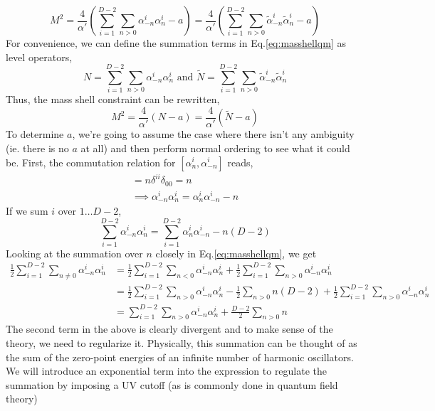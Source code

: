 \documentclass{article}
\providecommand{\brak}[1]{\ensuremath{\left(#1\right)}} %
\begin{document}
\begin{equation}
    M^2 = \frac{4}{\alpha'}\brak{\sum_{i=1}^{D-2}\sum_{n>0}\alpha_{-n}^i\alpha_n^i-a}=\frac{4}{\alpha'}\brak{\sum_{i=1}^{D-2}\sum_{n>0}\tilde{\alpha}_{-n}^i\tilde{\alpha}_n^i-a}\label{eq:masshellqm}
\end{equation}
For convenience, we can define the summation terms in Eq.\eqref{eq:masshellqm} as level operators,
\begin{equation}
    N=\sum_{i=1}^{D-2}\sum_{n>0}\alpha_{-n}^i\alpha_n^i \text{  and  } \tilde{N}=\sum_{i=1}^{D-2}\sum_{n>0}\tilde{\alpha}_{-n}^i\tilde{\alpha}_n^i
\end{equation}
Thus, the mass shell constraint can be rewritten,
\begin{equation}
    M^2=\frac{4}{\alpha'}(N-a) =\frac{4}{\alpha'}(\tilde{N}-a)
\end{equation}
To determine $a$, we're going to assume the case where there isn't any ambiguity (ie. there is no $a$ at all) and then perform normal ordering to see what it could be. First, the commutation relation for $[\alpha_n^i,\alpha_{-n}^i]$ reads,
\begin{align}
    [\alpha_n^i,\alpha_{-n}^i] = n\delta^{ii}\delta_{00}=n\\
    \implies \alpha_{-n}^i\alpha_n^i = \alpha_n^i\alpha_{-n}^i-n
\end{align}
If we sum $i$ over $1\dots D-2$,
\begin{equation}
    \sum_{i=1}^{D-2}\alpha_{-n}^i\alpha_n^i=\sum_{i=1}^{D-2}\alpha_n^i\alpha_{-n}^i-n(D-2)
\end{equation}
Looking at the summation over $n$ closely in Eq.\eqref{eq:masshellqm}, we get
\begin{align}
    \frac{1}{2}\sum_{i=1}^{D-2}\sum_{n\neq0}\alpha_{-n}^i\alpha_n^i&= \frac{1}{2}\sum_{i=1}^{D-2}\sum_{n<0}\alpha_{-n}^i\alpha_n^i+\frac{1}{2}\sum_{i=1}^{D-2}\sum_{n>0}\alpha_{-n}^i\alpha_n^i\\
    &= \frac{1}{2}\sum_{i=1}^{D-2}\sum_{n>0}\alpha_{-n}^i\alpha_n^i-\frac{1}{2}\sum_{n>0}n(D-2)+\frac{1}{2}\sum_{i=1}^{D-2}\sum_{n>0}\alpha_{-n}^i\alpha_n^i\\
    &=\sum_{i=1}^{D-2}\sum_{n>0}\alpha_{-n}^i\alpha_n^i+\frac{D-2}{2}\sum_{n>0}n\label{eq:sum_n}
\end{align}
The second term in the above is clearly divergent and to make sense of the theory, we need to regularize it. Physically, this summation can be thought of as the sum of the zero-point energies of an infinite number of harmonic oscillators. We will introduce an exponential term into the expression to regulate the summation by imposing a UV cutoff (as is commonly done in quantum field theory) 
\end{document}
